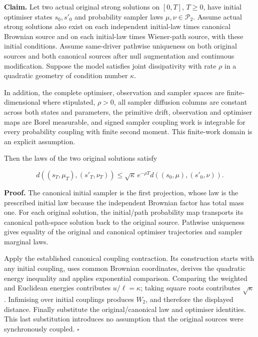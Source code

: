 \documentclass[11pt,a4paper]{report}
\begin{document}
\textbf{Claim.} Let two actual original strong solutions on \([0,T]\), \(T\ge0\), have initial optimiser states \(s_0,s'_0\) and probability sampler laws \(\mu,\nu\in\mathcal P_2\). Assume actual strong solutions also exist on each independent initial-law times canonical Brownian source and on each initial-law times Wiener-path source, with these initial conditions. Assume same-driver pathwise uniqueness on both original sources and both canonical sources after null augmentation and continuous modification. Suppose the model satisfies joint dissipativity with rate \(\rho\) in a quadratic geometry of condition number \(\kappa\).



In addition, the complete optimiser, observation and sampler spaces are finite-dimensional where stipulated, \(\rho>0\), all sampler diffusion columns are constant across both states and parameters, the primitive drift, observation and optimiser maps are Borel measurable, and signed sampler coupling work is integrable for every probability coupling with finite second moment. This finite-work domain is an explicit assumption.



Then the laws of the two original solutions satisfy

\[d((s_T,\mu_T),(s'_T,\nu_T))\le\sqrt\kappa\,e^{-\rho T}d((s_0,\mu),(s'_0,\nu)).\]

\textbf{Proof.} The canonical initial sampler is the first projection, whose law is the prescribed initial law because the independent Brownian factor has total mass one. For each original solution, the initial/\allowbreak{}path probability map transports its canonical path-space solution back to the original source. Pathwise uniqueness gives equality of the original and canonical optimiser trajectories and sampler marginal laws.



Apply the established canonical coupling contraction. Its construction starts with any initial coupling, uses common Brownian coordinates, derives the quadratic energy inequality and applies exponential comparison. Comparing the weighted and Euclidean energies contributes \(u/\ell=\kappa\); taking square roots contributes \(\sqrt\kappa\). Infimising over initial couplings produces \(W_2\), and therefore the displayed distance. Finally substitute the original/\allowbreak{}canonical law and optimiser identities. This last substitution introduces no assumption that the original sources were synchronously coupled. \(\square\)
\end{document}

